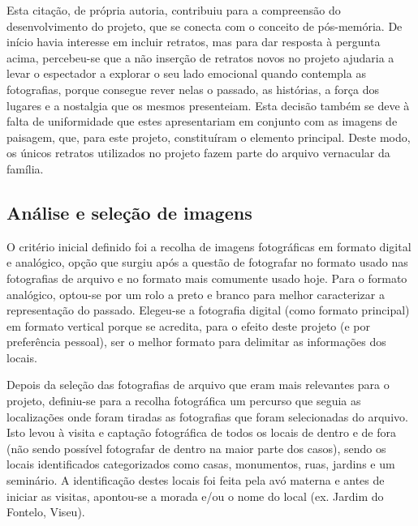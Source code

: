 \documentclass{article}
\begin{document}
Esta  citação,  de  própria  autoria,  contribuiu  para  a  compreensão  do 
desenvolvimento do projeto, que se conecta com o conceito de pós-memória. De início 
havia interesse em incluir retratos, mas para dar resposta à pergunta acima, percebeu-se 
que a não inserção de retratos novos no projeto ajudaria a levar o espectador a explorar o 
seu  lado  emocional  quando  contempla  as  fotografias,  porque  consegue  rever  nelas  o 
passado, as histórias, a força dos lugares e a nostalgia que os mesmos presenteiam. Esta 
decisão também se deve à falta de uniformidade que estes apresentariam em conjunto 
com as imagens de paisagem, que, para este projeto, constituíram o elemento principal. 
Deste modo, os únicos retratos utilizados no projeto fazem parte do arquivo vernacular 
da família. 
 
 

 






 
 
 



 
\subsection{{{Análise e seleção de imagens }}}
  
O critério inicial definido foi a recolha de imagens fotográficas em formato digital 
e  analógico,  opção  que  surgiu  após  a  questão  de  fotografar  no  formato  usado  nas 
fotografias  de  arquivo  e  no  formato  mais  comumente  usado  hoje.  Para  o  formato 
analógico, optou-se por um rolo a preto e branco para melhor caracterizar a representação 
do passado. Elegeu-se a fotografia digital (como formato principal) em formato vertical 
porque se acredita, para o efeito deste projeto (e por preferência pessoal), ser o melhor 
formato para delimitar as informações dos locais.  
 
Depois  da  seleção  das  fotografias  de  arquivo  que  eram  mais  relevantes  para  o 
projeto, definiu-se para a recolha fotográfica um percurso que seguia as localizações onde 
foram  tiradas  as  fotografias  que  foram  selecionadas  do  arquivo.  Isto  levou  à  visita  e 
captação fotográfica de todos os locais de dentro e de fora (não sendo possível fotografar 
de dentro na maior parte dos casos), sendo os locais identificados categorizados como 
casas, monumentos, ruas, jardins e um seminário. A identificação destes locais foi feita 
pela avó materna e antes de iniciar as visitas, apontou-se a morada e/ou o nome do local 
(ex. Jardim do Fontelo, Viseu).  
 
\end{document}

